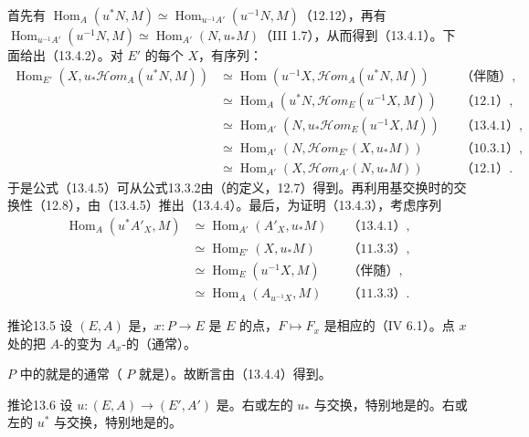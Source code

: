 首先有 $\operatorname{Hom}_A(u^*N,M)\simeq\operatorname{Hom}_{u^{-1}A'}(u^{-1}N,M)$（12.12），再有 $\operatorname{Hom}_{u^{-1}A'}(u^{-1}N,M)\simeq\operatorname{Hom}_{A'}(N,u_*M)$（III 1.7），从而得到（13.4.1）。下面给出（13.4.2）。对 $E'$ 的每个 $X$，有序列：
\begin{align*}
\operatorname{Hom}_{E'}(X,u_*\mathscr{H}\!om_A(u^*N,M))
&\simeq\operatorname{Hom}(u^{-1}X,\mathscr{H}\!om_A(u^*N,M))&&\text{（伴随）},\\
&\simeq\operatorname{Hom}_A(u^*N,\mathscr{H}\!om_E(u^{-1}X,M))&&\text{（12.1）},\\
&\simeq\operatorname{Hom}_{A'}(N,u_*\mathscr{H}\!om_E(u^{-1}X,M))&&\text{（13.4.1）},\\
&\simeq\operatorname{Hom}_{A'}(N,\mathscr{H}\!om_{E'}(X,u_*M))&&\text{（10.3.1）},\\
&\simeq\operatorname{Hom}_{A'}(X,\mathscr{H}\!om_{A'}(N,u_*M))&&\text{（12.1）}.
\end{align*}
于是公式（13.4.5）可从公式13.3.2由（的定义，12.7）得到。再利用基交换时的交换性（12.8），由（13.4.5）推出（13.4.4）。最后，为证明（13.4.3），考虑序列
\begin{align*}
\operatorname{Hom}_A(u^*A'_X,M)&\simeq\operatorname{Hom}_{A'}(A'_X,u_*M)&&\text{（13.4.1）},\\
&\simeq\operatorname{Hom}_{E'}(X,u_*M)&&\text{（11.3.3）},\\
&\simeq\operatorname{Hom}_E(u^{-1}X,M)&&\text{（伴随）},\\
&\simeq\operatorname{Hom}_A(A_{u^{-1}X},M)&&\text{（11.3.3）}.
\end{align*}
\begin{SGAresult}{推论}{13.5}
设 $(E,A)$ 是，$x:P\to E$ 是 $E$ 的点，$F\mapsto F_x$ 是相应的（IV 6.1）。点 $x$ 处的把 $A$-的变为 $A_x$-的（通常）。
\end{SGAresult}
$P$ 中的就是的通常（ $P$ 就是）。故断言由（13.4.4）得到。
\begin{SGAresult}{推论}{13.6}
设 $u:(E,A)\to(E',A')$ 是。右或左的 $u_*$ 与交换，特别地是的。右或左的 $u^*$ 与交换，特别地是的。
\end{SGAresult}
